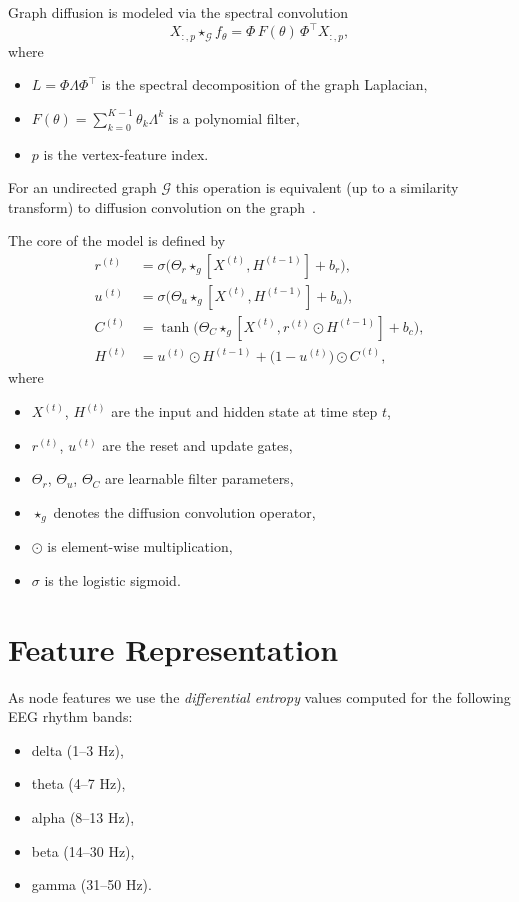\documentclass[12pt, twoside]{article}
\begin{document}
Graph diffusion is modeled via the spectral convolution
\[
X_{:,p} \star_{\mathcal{G}} f_\theta = \Phi\, F(\theta)\, \Phi^\top X_{:,p},
\]
where
\begin{itemize}
    \item $L = \Phi \Lambda \Phi^\top$ is the spectral decomposition of the graph Laplacian,
    \item $F(\theta) = \displaystyle\sum_{k=0}^{K-1} \theta_k \Lambda^k$ is a polynomial filter,
    \item $p$ is the vertex-feature index.
\end{itemize}
For an undirected graph $\mathcal{G}$ this operation is equivalent (up to a similarity transform) to diffusion convolution on the graph~\cite{DCRNN}.

The core of the model is defined by
\begin{align*}
r^{(t)} &= \sigma\!\bigl(\Theta_r \star_g [X^{(t)}, H^{(t-1)}] + b_r\bigr),\\
u^{(t)} &= \sigma\!\bigl(\Theta_u \star_g [X^{(t)}, H^{(t-1)}] + b_u\bigr),\\
C^{(t)} &= \tanh\!\bigl(\Theta_C \star_g [X^{(t)}, r^{(t)} \odot H^{(t-1)}] + b_c\bigr),\\
H^{(t)} &= u^{(t)} \odot H^{(t-1)} + \bigl(1-u^{(t)}\bigr) \odot C^{(t)},
\end{align*}
where
\begin{itemize}
    \item $X^{(t)}$, $H^{(t)}$ are the input and hidden state at time step $t$,
    \item $r^{(t)}$, $u^{(t)}$ are the reset and update gates,
    \item $\Theta_r$, $\Theta_u$, $\Theta_C$ are learnable filter parameters,
    \item $\star_g$ denotes the diffusion convolution operator,
    \item $\odot$ is element-wise multiplication,
    \item $\sigma$ is the logistic sigmoid.
\end{itemize}

\section{Feature Representation}

As node features we use the \emph{differential entropy} values computed for the following EEG rhythm bands:
\begin{itemize}
    \item delta (1--3 Hz),
    \item theta (4--7 Hz),
    \item alpha (8--13 Hz),
    \item beta  (14--30 Hz),
    \item gamma (31--50 Hz).
\end{itemize}
\end{document}
